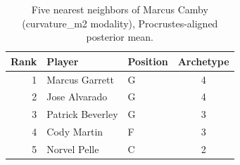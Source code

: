 \begin{table}[htbp]
  \centering\small
  \begin{tabular}{rllc}
    \toprule
    Rank & Player & Position & Archetype \\
    \midrule
    1 & Marcus Garrett & G & 4 \\
    2 & Jose Alvarado & G & 4 \\
    3 & Patrick Beverley & G & 3 \\
    4 & Cody Martin & F & 3 \\
    5 & Norvel Pelle & C & 2 \\
    \bottomrule
  \end{tabular}
  \caption{Five nearest neighbors of Marcus Camby (curvature_m2 modality), Procrustes-aligned posterior mean.}
  \label{tab:Marcus_Camby_neighbors_curvature_m2}
\end{table}

